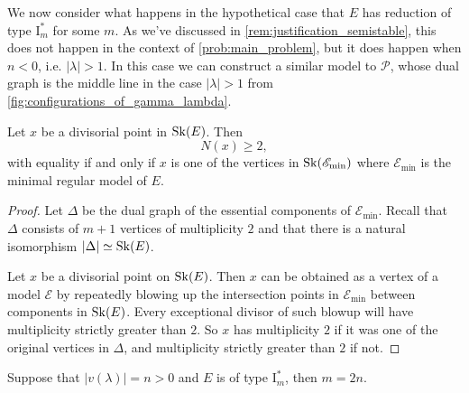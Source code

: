 We now consider what happens in the hypothetical case that $E$ has reduction of type $\mathrm I_m^*$ for some $m$. 
As we've discussed in \cref{rem:justification_semistable}, this does not happen in the context of \cref{prob:main_problem}, but it does happen when $n < 0$, i.e. $|\lambda| > 1$.  
In this case we can construct a similar model to $\mathscr P$, whose dual graph is the middle line in the case $|\lambda| > 1$ from \cref{fig:configurations_of_gamma_lambda}. 


\begin{lemma}\label{lem:divisorial_points_Is}
	Let $x$ be a divisorial point in $\operatorname{Sk}(E)$. 
	Then  \[
		N(x) \ge 2
	,\] 
	with equality if and only if $x$ is one of the vertices in $\operatorname{Sk}(\mathscr E_\text{min} )$ where $\mathscr E_\text{min} $ is the minimal regular model of $E$. 
\end{lemma}
\begin{proof}
	Let $\Delta$ be the dual graph of the essential components of $\mathscr E_\text{min} $. 
	Recall that $\Delta$ consists of $m + 1$ vertices of multiplicity $2$ and that there is a natural isomorphism $ |\Delta| \simeq \operatorname{Sk}(E)$. 

	Let $x$ be a divisorial point on $\operatorname{Sk}(E)$.
	Then $x$ can be obtained as a vertex of a model $\mathscr E$ by repeatedly blowing up the intersection points in $\mathscr E_\text{min} $ between components in $\operatorname{Sk}(E)$. 
	Every exceptional divisor of such blowup will have multiplicity strictly greater than $2$. 
	So $x$ has multiplicity $2$ if it was one of the original vertices in $\Delta$, and multiplicity strictly greater than $2$ if not. 
\end{proof}

\begin{proposition}\label{prop:m_when_E_type_Is}
	Suppose that $|v(\lambda)| = n > 0$ and $E$ is of type $\mathrm I_m^*$, then $m = 2n$. 
\end{proposition}

